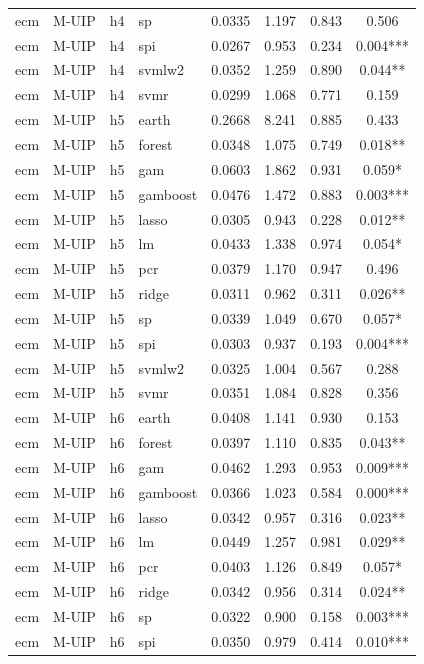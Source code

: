 \begin{ThreePartTable}
\begin{longtable}[t]{llclcccc}
ecm & M-UIP & h4 & sp & 0.0335 & 1.197 & 0.843 & 0.506\\
ecm & M-UIP & h4 & spi & 0.0267 & 0.953 & 0.234 & 0.004***\\
ecm & M-UIP & h4 & svmlw2 & 0.0352 & 1.259 & 0.890 & 0.044**\\
ecm & M-UIP & h4 & svmr & 0.0299 & 1.068 & 0.771 & 0.159\\
\addlinespace
ecm & M-UIP & h5 & earth & 0.2668 & 8.241 & 0.885 & 0.433\\
ecm & M-UIP & h5 & forest & 0.0348 & 1.075 & 0.749 & 0.018**\\
ecm & M-UIP & h5 & gam & 0.0603 & 1.862 & 0.931 & 0.059*\\
ecm & M-UIP & h5 & gamboost & 0.0476 & 1.472 & 0.883 & 0.003***\\
ecm & M-UIP & h5 & lasso & 0.0305 & 0.943 & 0.228 & 0.012**\\
ecm & M-UIP & h5 & lm & 0.0433 & 1.338 & 0.974 & 0.054*\\
ecm & M-UIP & h5 & pcr & 0.0379 & 1.170 & 0.947 & 0.496\\
ecm & M-UIP & h5 & ridge & 0.0311 & 0.962 & 0.311 & 0.026**\\
ecm & M-UIP & h5 & sp & 0.0339 & 1.049 & 0.670 & 0.057*\\
ecm & M-UIP & h5 & spi & 0.0303 & 0.937 & 0.193 & 0.004***\\
ecm & M-UIP & h5 & svmlw2 & 0.0325 & 1.004 & 0.567 & 0.288\\
ecm & M-UIP & h5 & svmr & 0.0351 & 1.084 & 0.828 & 0.356\\
\addlinespace
ecm & M-UIP & h6 & earth & 0.0408 & 1.141 & 0.930 & 0.153\\
ecm & M-UIP & h6 & forest & 0.0397 & 1.110 & 0.835 & 0.043**\\
ecm & M-UIP & h6 & gam & 0.0462 & 1.293 & 0.953 & 0.009***\\
ecm & M-UIP & h6 & gamboost & 0.0366 & 1.023 & 0.584 & 0.000***\\
ecm & M-UIP & h6 & lasso & 0.0342 & 0.957 & 0.316 & 0.023**\\
ecm & M-UIP & h6 & lm & 0.0449 & 1.257 & 0.981 & 0.029**\\
ecm & M-UIP & h6 & pcr & 0.0403 & 1.126 & 0.849 & 0.057*\\
ecm & M-UIP & h6 & ridge & 0.0342 & 0.956 & 0.314 & 0.024**\\
ecm & M-UIP & h6 & sp & 0.0322 & 0.900 & 0.158 & 0.003***\\
ecm & M-UIP & h6 & spi & 0.0350 & 0.979 & 0.414 & 0.010***\\

\end{longtable}
\end{ThreePartTable}
